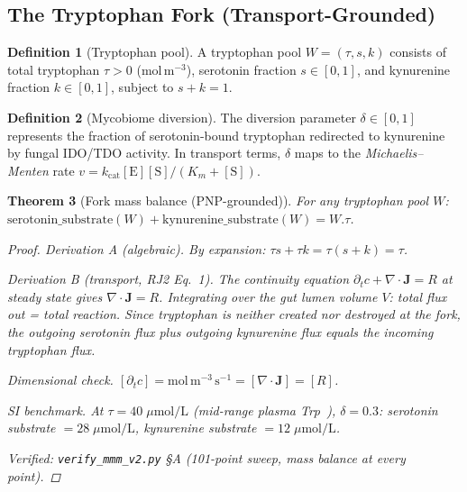 \documentclass[12pt,oneside]{article}
\theoremstyle{principia}
\newtheorem{theorem}{Theorem}[section]
\theoremstyle{definition}
\newtheorem{definition}[theorem]{Definition}
\theoremstyle{remark}
\begin{document}
\subsection{The Tryptophan Fork (Transport-Grounded)}

\begin{definition}[Tryptophan pool]
A tryptophan pool $W = (\tau, s, k)$ consists of total tryptophan
$\tau > 0$ (mol\,m$^{-3}$), serotonin fraction $s \in [0,1]$, and
kynurenine fraction $k \in [0,1]$, subject to $s + k = 1$.
\end{definition}

\begin{definition}[Mycobiome diversion]
\label{def:diversion}
The diversion parameter $\delta \in [0,1]$ represents the fraction of
serotonin-bound tryptophan redirected to kynurenine by fungal IDO/TDO
activity. In transport terms, $\delta$ maps to the \emph{Michaelis--Menten}
rate $v = k_\mathrm{cat}[\mathrm{E}][\mathrm{S}]/(K_m + [\mathrm{S}])$.
\end{definition}

\begin{theorem}[Fork mass balance (PNP-grounded)]
\label{thm:mass}
For any tryptophan pool $W$:
$\mathrm{serotonin\_substrate}(W) + \mathrm{kynurenine\_substrate}(W) = W.\tau$.

\begin{proof}
\emph{Derivation A (algebraic).} By expansion: $\tau s + \tau k = \tau(s+k) = \tau$.

\emph{Derivation B (transport, RJ2 Eq.~1).}
The continuity equation $\partial_t c + \nabla\cdot\mathbf{J} = R$ at
steady state gives $\nabla\cdot\mathbf{J} = R$. Integrating over the
gut lumen volume $V$: total flux out = total reaction. Since tryptophan
is neither created nor destroyed at the fork, the outgoing serotonin
flux plus outgoing kynurenine flux equals the incoming tryptophan flux.

\emph{Dimensional check.}
$[\partial_t c] = \mathrm{mol\,m^{-3}\,s^{-1}} = [\nabla\cdot\mathbf{J}] = [R]$. \checkmark

\emph{SI benchmark.}
At $\tau = 40\;\mu\mathrm{mol/L}$ (mid-range plasma Trp~\cite{fernstrom71}),
$\delta = 0.3$: serotonin substrate $= 28\;\mu\mathrm{mol/L}$,
kynurenine substrate $= 12\;\mu\mathrm{mol/L}$.

Verified: \texttt{verify\_mmm\_v2.py} \S A (101-point sweep, mass balance
at every point).
\qedhere
\end{proof}
\end{theorem}
\end{document}
